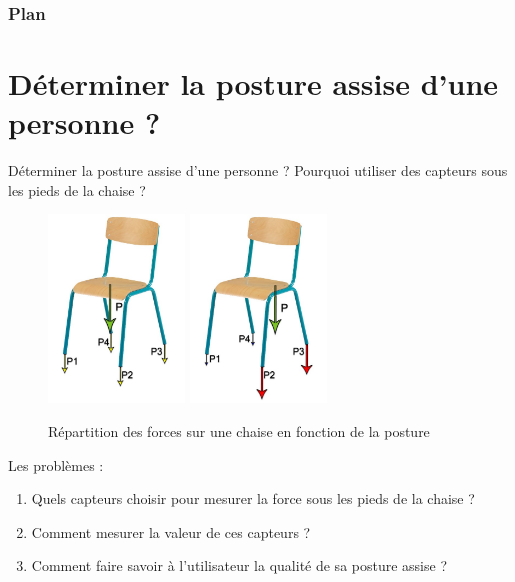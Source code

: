 \documentclass{beamer}
\begin{document}
\begin{frame}
\frametitle{Plan}
\tableofcontents
\end{frame}

\section{Déterminer la posture assise d'une personne ?}
\begin{frame}
\begin{block}{Déterminer la posture assise d'une personne ?}
Pourquoi utiliser des capteurs sous les pieds de la chaise ?
\begin{figure}
\begin{center}
\includegraphics[height=5cm]{images/Chaise_forces_homo.jpg}
\includegraphics[height=5cm]{images/Chaise_forces_hetero.jpg}
\end{center}
\caption{Répartition des forces sur une chaise en fonction de la posture}
\label{fig:chaise_repartition}
\end{figure}
\end{block}
\end{frame}


\begin{frame}
\begin{block}{Les problèmes :}
\begin{enumerate}
\item Quels capteurs choisir pour mesurer la force sous les pieds de la chaise ?
\item Comment mesurer la valeur de ces capteurs ?
\item Comment faire savoir à l'utilisateur la qualité de sa posture assise ?
\end{enumerate}
\end{block}
\end{frame}
\end{document}
